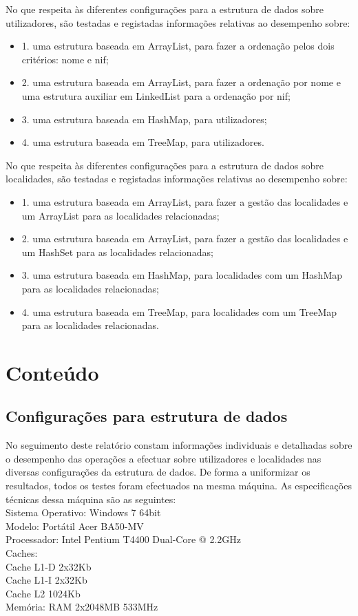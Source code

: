 \documentclass[a5paper,twocolumn, 11pt]{article}
\begin{document}
No que respeita às diferentes configurações para a estrutura de dados sobre utilizadores,
são testadas e registadas informações relativas ao desempenho sobre:
\begin{itemize}
    \item{1. uma estrutura baseada em ArrayList, para fazer a ordenação pelos
dois critérios: nome e nif;}
    \item{2. uma estrutura baseada em ArrayList, para fazer a ordenação por nome
e uma estrutura auxiliar em LinkedList para a ordenação por nif;}
    \item{3. uma estrutura baseada em HashMap, para utilizadores;}
    \item{4. uma estrutura baseada em TreeMap, para utilizadores.}
\end{itemize}
No que respeita às diferentes configurações para a estrutura de dados sobre localidades,
são testadas e registadas informações relativas ao desempenho sobre:
\begin{itemize}
    \item{1. uma estrutura baseada em ArrayList, para fazer a gestão das localidades e um ArrayList para as localidades relacionadas;}
    \item{2. uma estrutura baseada em ArrayList, para fazer a gestão das localidades e um HashSet para as localidades relacionadas;}
    \item{3. uma estrutura baseada em HashMap, para localidades com um HashMap
para as localidades relacionadas;}
    \item{4. uma estrutura baseada em TreeMap, para localidades com um TreeMap
para as localidades relacionadas.}
\end{itemize}
\clearpage
\newpage
\section{Conteúdo}
\subsection{Configurações para estrutura de dados}
No seguimento deste relatório constam informações individuais e detalhadas sobre o desempenho das operações a efectuar sobre utilizadores e localidades nas diversas configurações da estrutura de dados. De forma a uniformizar os resultados, todos os testes foram efectuados na mesma máquina. As especificações técnicas dessa máquina são as seguintes:\\
Sistema Operativo: Windows 7 64bit\\
Modelo: Portátil Acer BA50-MV\\
Processador: Intel Pentium T4400 Dual-Core @ 2.2GHz\\
Caches:\\
Cache L1-D 2x32Kb\\
Cache L1-I 2x32Kb\\
Cache L2 1024Kb\\
Memória: RAM 2x2048MB 533MHz\\
\end{document}
